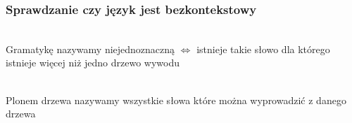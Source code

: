 \subsubsection{Sprawdzanie czy język jest bezkontekstowy}

	\begin{df}~\\
		Gramatykę nazywamy niejednoznaczną $\Leftrightarrow$ istnieje takie słowo dla którego istnieje więcej niż jedno drzewo wywodu		
	\end{df}
	
	\begin{df}~\\
		Plonem drzewa nazywamy wszystkie słowa które można wyprowadzić z danego drzewa
	\end{df}	
	
